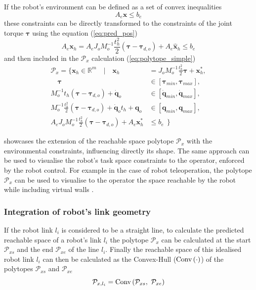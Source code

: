 If the robot's environment can be defined as a set of convex inequalities
\begin{equation}
    A_e \bm{x} \leq b_e
\end{equation}
these constraints can be directly transformed to the constraints of the joint torque $\bm{\tau}$ using the equation (\ref{eq:pred_pos})
\begin{equation}
    A_e\bm{x}_{h} = A_e J_o M_o^{-1}\frac{t_h^2}{2} (\bm{\tau} -\bm{\tau}_{d,o}) + A_e \hat{\bm{x}}_{h} \leq b_e
    \label{eq:env_limits}
\end{equation}
and then included in the $\mathcal{P}_x$ calculation (\ref{eq:polytope_simple})
\begin{equation}
\begin{split}
    \mathcal{P}_x= \{ \bm{x}_h \in \mathbb{R}^m \quad| \quad \bm{x}_h &= J_o M_o^{-1}\frac{t_h^2}{2}\bm{\tau} + \bm{x}^*_h,\\
   \quad \bm{\tau} &\in \left[\bm{\tau}_{min},\bm{\tau}_{max}\right],\\
    M_o^{-1}t_h (\bm{\tau} -\bm{\tau}_{d,o})+ \dot{\bm{q}}_o &\in \left[\dot{\bm{q}}_{min},\dot{\bm{q}}_{max}\right],\\
   M_o^{-1}\frac{t_h^2}{2}(\bm{\tau} -\bm{\tau}_{d,o}) +  \dot{\bm{q}}_ot_h + \bm{q}_o &\in \left[\bm{q}_{min},\bm{q}_{max}\right],\\
   A_e J_o M_o^{-1}\frac{t_h^2}{2} (\bm{\tau} -\bm{\tau}_{d,o}) + A_e \bm{x}^*_h &\leq b_e ~~\}
\end{split} 
\label{eq:env}
\end{equation}

 showcases the extension of the reachable space polytope $\mathcal{P}_x$ with the environmental constraints, influencing directly its shape. The same approach can be used to visualise the robot's task space constraints to the operator, enforced by the robot control. For example in the case of robot teleoperation, the polytope $\mathcal{P}_x$ can be used to visualise to the operator the space reachable by the robot while including virtual walls \cite{Colgate1996Cobots}.




\subsubsection{Integration of robot's link geometry}

If the robot link $l_i$ is considered to be a straight line, to calculate the predicted reachable space of a robot's link $l_i$ the polytope $\mathcal{P}_x$ can be calculated at the start $\mathcal{P}_{xs}$ and the end $\mathcal{P}_{xe}$ of the line $l_i$.  Finally the reachable space of this idealised robot link $l_i$ can then be calculated as the Convex-Hull ($\text{Conv}\left(\cdot\right)$) of the polytopes $\mathcal{P}_{xs}$ and $\mathcal{P}_{xe}$
\begin{equation}
    \mathcal{P}_{x,l_i} = \text{Conv}\left(  \mathcal{P}_{xs}, ~ \mathcal{P}_{xe}\right)
\end{equation}

